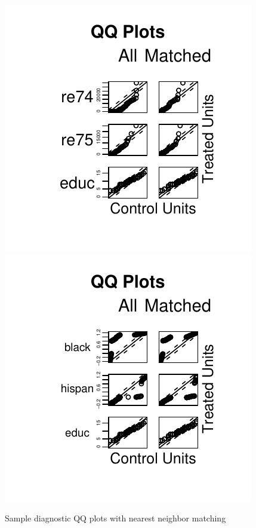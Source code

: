 \begin{figure}[tbp]
  \begin{center}
    \includegraphics{figs/qqplotnn1}
    \includegraphics{figs/qqplotnn2}
    \hfill
    \caption{Sample diagnostic QQ plots with nearest neighbor matching}
    \label{diagqqnn}
  \end{center}
\end{figure}

